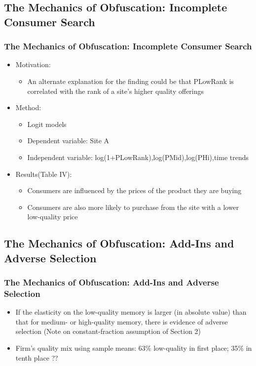 \documentclass{beamer}
\begin{document}
\subsection{The Mechanics of Obfuscation: Incomplete Consumer Search}
\begin{frame}[allowframebreaks]
\frametitle{The Mechanics of Obfuscation: Incomplete Consumer Search}
\begin{itemize}
\item Motivation:
\begin{itemize}
\item An alternate explanation for the finding could be that PLowRank is correlated with the rank of a site's higher quality offerings
\end{itemize}
\item Method:
\begin{itemize}
\item Logit models
\item Dependent variable: Site A
\item Independent variable: log(1+PLowRank),log(PMid),log(PHi),time trends
\end{itemize}

\framebreak
\item Results(Table IV):
\begin{itemize}
\item Consumers are influenced by the prices of the product they are buying
\item Consumers are also more likely to purchase from the site with a lower low-quality price
\end{itemize}
\end{itemize}
\end{frame}

\subsection{The Mechanics of Obfuscation: Add-Ins and Adverse Selection}
\begin{frame}
\frametitle{The Mechanics of Obfuscation: Add-Ins and Adverse Selection}
\begin{itemize}
\item If the elasticity on the low-quality memory is larger (in absolute value) than that for medium- or high-quality memory, there is evidence of adverse selection (Note on constant-fraction assumption of Section 2)
\item  Firm's quality mix using sample means: 63\% low-quality in first place; 35\% in tenth place ??
\end{itemize}
\end{frame}
\end{document}
